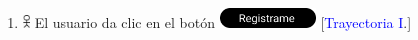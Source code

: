 \begin{enumerate}


                       


                       \item \includegraphics[width=0.0150\textwidth]{Figuras/persona.png} El usuario da clic en el botón \includegraphics[width=0.2\textwidth]{Group 93.png}  [\textcolor{blue}{Trayectoria I}.] 
                       


\end{enumerate}
